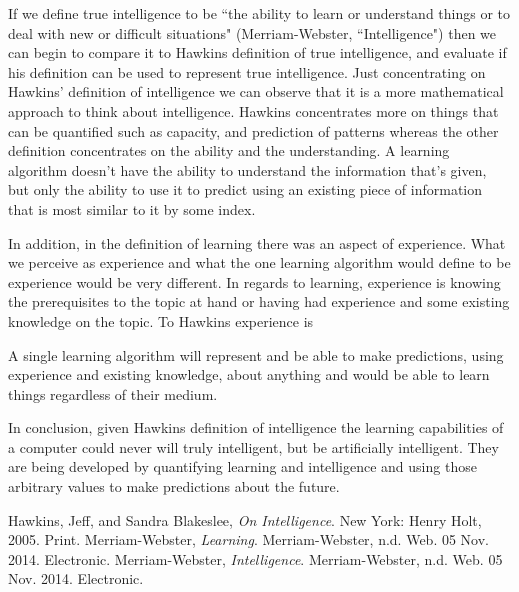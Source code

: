 \documentclass[11pt, oneside]{article}
\begin{document}

\par 
If we define true intelligence to be ``the ability to learn or understand things or to deal with new or difficult situations" (Merriam-Webster, ``Intelligence") then we can begin to compare it to Hawkins definition of true intelligence, and evaluate if his definition can be used to represent true intelligence. Just concentrating on Hawkins' definition of intelligence we can observe that it is a more mathematical approach to think about intelligence. Hawkins concentrates more on things that can be quantified such as capacity, and prediction of patterns whereas the other definition concentrates on the ability and the understanding. A learning algorithm doesn't have the ability to understand the information that's given, but only the ability to use it to predict using an existing piece of information that is most similar to it by some index. 


\par In addition, in the definition of learning there was an aspect of experience. What we perceive as experience and what the one learning algorithm would define to be experience would be very different. In regards to learning, experience is knowing the prerequisites to the topic at hand or having had experience and some existing knowledge on the topic. To Hawkins experience is 

\par A single learning algorithm will represent and be able to make predictions, using experience and existing knowledge, about anything and would be able to learn things regardless of their medium. 

\par In conclusion, given Hawkins definition of intelligence the learning capabilities of a computer could never will truly intelligent, but be artificially intelligent. They are being developed by quantifying learning and intelligence and using those arbitrary values to make predictions about the future. 

\begin{thebibliography}{9}
  Hawkins, Jeff, and Sandra Blakeslee,
  \emph{On Intelligence}.
  New York: Henry Holt, 2005.
  Print.
  Merriam-Webster,
  \emph{Learning}.
  Merriam-Webster, n.d. Web. 05 Nov. 2014.
  Electronic.
  Merriam-Webster,
  \emph{Intelligence}.
  Merriam-Webster, n.d. Web. 05 Nov. 2014.
  Electronic.
\end{thebibliography}
\end{document}
